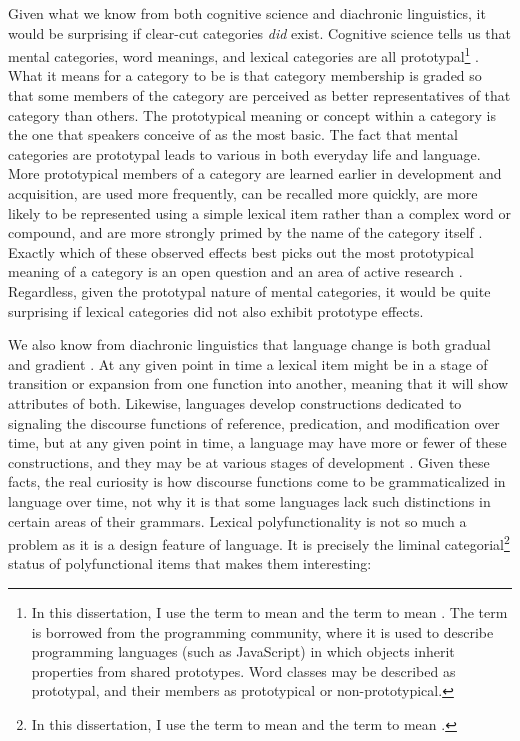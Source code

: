 Given what we know from both cognitive science and diachronic linguistics, it would be surprising if clear-cut categories \emph{did} exist. Cognitive science tells us that mental categories, word meanings, and lexical categories are all prototypal\footnote{In this dissertation, I use the term  to mean  and the term  to mean . The term  is borrowed from the programming community, where it is used to describe programming languages (such as JavaScript) in which objects inherit properties from shared prototypes. Word classes may be described as prototypal, and their members as prototypical or non-prototypical.} \parencite{Taylor2003}. What it means for a category to be  is that category membership is graded so that some members of the category are perceived as better representatives of that category than others. The prototypical meaning or concept within a category is the one that speakers conceive of as the most basic. The fact that mental categories are prototypal leads to various  in both everyday life and language. More prototypical members of a category are learned earlier in development and acquisition, are used more frequently, can be recalled more quickly, are more likely to be represented using a simple lexical item rather than a complex word or compound, and are more strongly primed by the name of the category itself \parencite[78--79]{CroftCruse2004}. Exactly which of these observed effects best picks out the most prototypical meaning of a category is an open question and an area of active research \parencites[75]{Gries2006}[58--59]{GriesDivjak2009}. Regardless, given the prototypal nature of mental categories, it would be quite surprising if lexical categories did not also exhibit prototype effects.

We also know from diachronic linguistics that language change is both gradual and gradient \parencites{HopperTraugott2003}{TraugottTrousdale2010}. At any given point in time a lexical item might be in a stage of transition or expansion from one function into another, meaning that it will show attributes of both. Likewise, languages develop constructions dedicated to signaling the discourse functions of reference, predication, and modification over time, but at any given point in time, a language may have more or fewer of these constructions, and they may be at various stages of development \parencite{Vogel2000}. Given these facts, the real curiosity is how discourse functions come to be grammaticalized in language over time, not why it is that some languages lack such distinctions in certain areas of their grammars. Lexical polyfunctionality is not so much a problem as it is a design feature of language. It is precisely the liminal categorial\footnote{In this dissertation, I use the term  to mean  and the term  to mean .} status of polyfunctional items that makes them interesting:


